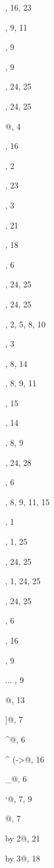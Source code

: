 \documentclass[12pt]{article}
\begin{document}
{\begin{theindex}
  \item \verb@\cube@, 16, 23
  \item \verb@\dtriangle@, 9, 11
  \item \verb@\efig@, 9
  \item \verb@\endxy@, 9
  \item \verb@\epi@, 24, 25
  \item \verb@\epileft@, 24, 25
  \item \verb@{}@, 4
  \item \verb@\hSquares@, 16
  \item \verb@\halign@, 2
  \item \verb@\hole@, 23
  \item \verb@\ignorespaces@, 3
  \item \verb@\iiixii@, 21
  \item \verb@\iiixiii@, 18
  \item \verb@\let{}=\textstyle@, 6
  \item \verb@\mon@, 24, 25
  \item \verb@\monleft@, 24, 25
  \item \verb@\morphism@, 2, 5, 8, 10
  \item \verb@{}, 3
  \item \verb@\place@, 8, 14
  \item \verb@\ptriangle@, 8, 9, 11
  \item \verb@\pullback@, 15
  \item \verb@\put@, 14
  \item \verb@\qtriangle@, 8, 9
  \item \verb@\scalefactor@, 24, 28
  \item \verb@\scriptstyle@, 6
  \item \verb@\square@, 8, 9, 11, 15
  \item \verb@\three@, 1
  \item \verb@\to@, 1, 25
  \item \verb@\toleft@, 24, 25
  \item \verb@\two@, 1, 24, 25
  \item \verb@\twoleft@, 24, 25
  \item \verb@\ul@, 6
  \item \verb@\vSquares@, 16
  \item \verb@\xy@, 9
  \item \verb@\xy ... \endxy@, 9
  \item \verb@{}@, 13
  \item \verb@]@, 7
  \item \verb@^@, 6
  \item \verb@^{ (}->@, 16
  \item \verb@_@, 6
  \item \verb@`@, 7, 9
  \item \verb@{*}@, 7
  \item {} by 2@, 21
  \item {} by 3@, 18


\end{theindex}}
\end{document}
